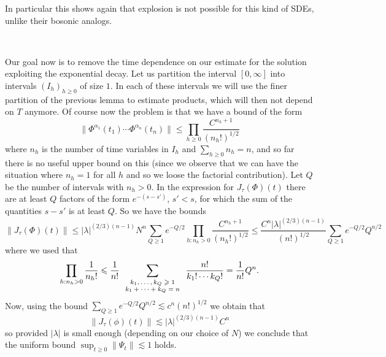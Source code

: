 \documentclass{article}
\newcommand{\tmscript}[1]{\text{\scriptsize{$#1$}}}
\begin{document}
In particular this shows again that explosion is not possible for this kind of
SDEs, unlike their bosonic analogs.

\

Our goal now is to remove the time dependence on our estimate for the
solution exploiting the exponential decay. Let us partition the interval $[0,
\infty]$ into intervals $(I_h)_{h \geqslant 0}$ of size $1$. In each of these
intervals we will use the finer partition of the previous lemma to estimate
products, which will then not depend on $T$ anymore. Of course now the problem
is that we have a bound of the form
\[ \| \Phi^{\alpha_1} (t_1) \cdots \Phi^{\alpha_n} (t_n) \| \leqslant \prod_{h
   \geqslant 0} \frac{C^{n_h + 1}}{(n_h !)^{1 / 2}} \]
where $n_h$ is the number of time variables in $I_h$ and $\sum_{h \geqslant 0}
n_h = n$, and so far there is no useful upper bound on this (since we observe
that we can have the situation where $n_h = 1$ for all $h$ and so we loose the
factorial contribution). Let $Q$ be the number of intervals with $n_h > 0$. In
the expression for $J_{\tau} (\Phi) (t)$ there are at least $Q$ factors of the
form $e^{- (s - s')}$, $s' < s$, for which the sum of the quantities $s - s'$
is at least $Q$. So we have the bounds
\[ \| J_{\tau} (\Phi) (t) \| \leqslant | \lambda |^{(2 / 3) (n - 1)} N^n
   \sum_{Q \geqslant 1} e^{- Q / 2} \prod_{h : n_h > 0} \frac{C^{n_h +
   1}}{(n_h !)^{1 / 2}} \leqslant \frac{C^n | \lambda |^{(2 / 3) (n -
   1)}}{(n!)^{1 / 2}} \sum_{Q \geqslant 1} e^{- Q / 2} Q^{n / 2} \]
where we used that
\[ \prod_{h : n_h > 0} \frac{1}{n_h !} \leqslant \frac{1}{n!}
   \sum_{\tmscript{\begin{array}{c}
     k_1, \ldots, k_Q \geqslant 1\\
     k_1 + \cdots + k_Q = n
   \end{array}}} \frac{n!}{k_1 ! \cdots k_Q !} = \frac{1}{n!} Q^n . \]
Now, using the bound $\sum_{Q \geqslant 1} e^{- Q / 2} Q^{n / 2} \lesssim c^n
(n!)^{1 / 2}$ we obtain that
\[ \| J_{\tau} (\phi) (t) \| \lesssim | \lambda |^{(2 / 3) (n - 1)} C^n \]
so provided $| \lambda |$ is small enough (depending on our choice of $N$) we
conclude that the uniform bound $\sup_{t \geqslant 0} \| \Psi_t \| \lesssim 1$
holds.
\end{document}

